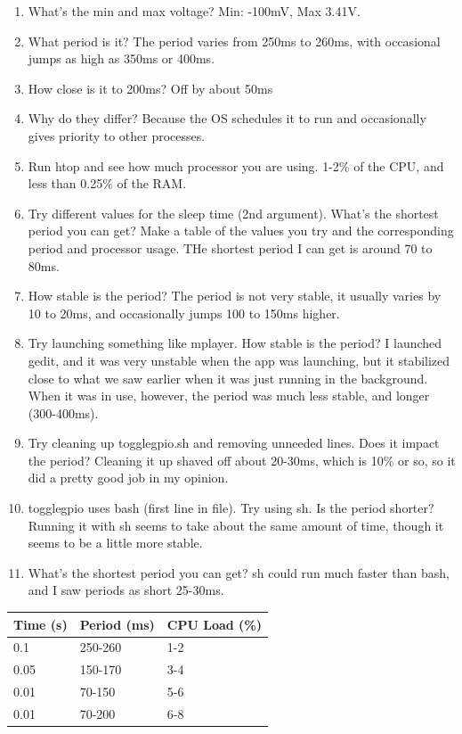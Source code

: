 \documentclass[letterpaper,10pt]{texMemo}
\begin{document}
\begin{enumerate}
 \item What's the min and max voltage? Min: -100mV, Max 3.41V.
 \item What period is it? The period varies from 250ms to 260ms, with
occasional jumps as high as 350ms or 400ms.
 \item How close is it to 200ms? Off by about 50ms
 \item Why do they differ? Because the OS schedules it to run and occasionally
gives priority to other processes.
 \item Run htop and see how much processor you are using. 1-2\% of the CPU, and
less than 0.25\% of the RAM.
 \item Try different values for the sleep time (2nd argument). What's the
shortest
period you can get? Make a table of the values you try and the corresponding
period and processor usage. THe shortest period I can get is around 70 to 80ms.
 \item How stable is the period? The period is not very stable, it usually
varies by 10 to 20ms, and occasionally jumps 100 to 150ms higher.
 \item Try launching something like mplayer. How stable is the period? I
launched gedit, and it was very unstable when the app was launching, but it
stabilized close to what we saw earlier when it was just running in the
background. When it was in use, however, the period was much less stable, and
longer (300-400ms).
 \item Try cleaning up togglegpio.sh and removing unneeded lines. Does it impact
the period? Cleaning it up shaved off about 20-30ms, which is 10\% or so, so it
did a pretty good job in my opinion.
 \item togglegpio uses bash (first line in file). Try using sh. Is the period
shorter? Running it with sh seems to take about the same amount of time, though
it seems to be a little more stable.
 \item What's the shortest period you can get? sh could run much faster than
bash, and I saw periods as short 25-30ms.
\end{enumerate}

\begin{center}
\begin{tabular}{| l | l | l |}
\hline
\textbf{Time (s)} & \textbf{Period (ms)} & \textbf{CPU Load (\%)}\\
\hline
0.1 & 250-260 & 1-2\\
\hline
0.05 & 150-170 & 3-4\\
\hline
0.01 & 70-150  & 5-6\\ 
\hline
0.01 & 70-200 & 6-8\\
\hline
\end{tabular}
\end{center}
\end{document}
